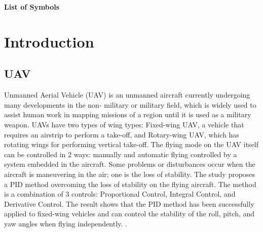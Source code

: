 \documentclass[a4paper,12pt,oneside]{report}
\begin{document}
\begin{abstract}\vspace{1cm} 
\noindent

Unmanned Aerial Vehicles (UAVs) are increasingly used for mapping and military applications. Fixed-wing UAVs require a runway for takeoff, while rotary-wing UAVs can take off vertically. UAV flight can be manual or autonomous, but both face stability challenges during maneuvers. This study implemented a Proportional–Integral–Derivative (PID) control system to maintain stability in roll, pitch, and yaw axes. The results demonstrate that the PID controller effectively stabilizes fixed-wing UAVs during autonomous flight, providing reliable control under varying conditions.


\end{abstract}
\newpage
\tableofcontents 	\cleardoublepage%
{} 
\listoffigures 	\cleardoublepage %
{}
\listoftables 	\cleardoublepage%
{}
\newpage
{\Huge \bf List of Symbols}
\noindent


\chapter{Introduction}
\label{chap:intro}
\section{UAV}
Unmanned Aerial Vehicle (UAV) is an unmanned aircraft currently undergoing many developments in the non- military or military field, which is widely used to assist human work in mapping missions of a region until it is used as a military weapon. UAVs have two types of wing types: Fixed-wing UAV, a vehicle that requires an airstrip to perform a take-off, and Rotary-wing UAV, which has rotating wings for performing vertical take-off. The flying mode on the UAV itself can be controlled in 2 ways: manually and automatic flying controlled by a system embedded in the aircraft. Some problems or disturbances occur when the aircraft is maneuvering in the air; one is the loss of stability. The study proposes a PID method overcoming the loss of stability on the flying aircraft. The method is a combination of 3 controls: Proportional Control, Integral Control, and Derivative Control. The result shows that the PID method has been successfully applied to fixed-wing vehicles and can control the stability of the roll, pitch, and yaw angles when flying independently. .
\end{document}
